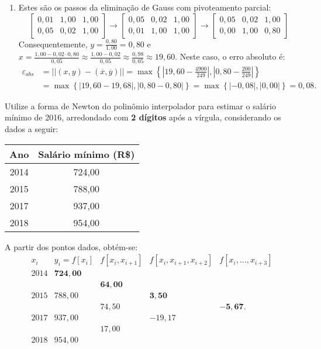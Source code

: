 \documentclass[12pt,a4paper]{article}
\begin{document}
\begin{ExerciseList}
\begin{enumerate}
\item Estes são os passos da eliminação de Gauss com pivoteamento parcial:
\[
\begin{bmatrix}
0,01 & 1,00 & 1,00\\
0,05 & 0,02 & 1,00
\end{bmatrix}
\rightarrow
\begin{bmatrix}
0,05 & 0,02 & 1,00\\
0,01 & 1,00 & 1,00
\end{bmatrix}
\rightarrow
\begin{bmatrix}
0,05 & 0,02 & 1,00\\
0,00 & 1,00 & 0,80
\end{bmatrix}
\]
Consequentemente, $y = \frac{0,80}{1,00} = 0,80$ e
$x = \frac{1,00 - 0,02 \cdot 0,80}{0,05}
\approx \frac{1,00 - 0,02}{0,05}
\approx \frac{0,98}{0,05}
\approx 19,60$. Neste caso, o erro absoluto é:
\begin{align*}
\varepsilon_{abs}
& = ||(x,y) - (\overline{x},\overline{y})||
  = \max \left\{ \left|19,60 - \frac{4900}{249}\right|, \left|0,80 - \frac{200}{249}\right| \right\}\\
& = \max \left\{ \left|19,60 - 19,68\right|, \left|0,80 - 0,80\right| \right\}
  = \max \left\{ \left|-0,08\right|, \left|0,00\right| \right\}
  = 0,08.
\end{align*}
\end{enumerate}


\Exercise[title={2,5}]
Utilize a forma de Newton do polinômio interpolador para estimar o salário mínimo de 2016, arredondado com \textbf{2 dígitos} após a vírgula, considerando os dados a seguir:
\medskip
\begin{center}
\begin{tabular}{cc}
\hline
Ano & Salário mínimo (R\$) \\
\hline
2014 & 724,00 \\
2015 & 788,00 \\
2017 & 937,00 \\
2018 & 954,00 \\
\hline
\end{tabular}
\end{center}
\Answer
A partir dos pontos dados, obtém-se:
\[
\begin{array}{ccccc}
x_i
& y_i=f[x_i]
& f[x_i,x_{i+1}]
& f[x_i,x_{i+1},x_{i+2}]
& f[x_i,\ldots,x_{i+3}]\\
2014 & \mathbf{724,00} \\
     & & \mathbf{64,00} \\
2015 & 788,00 & & \mathbf{3,50} \\
     & & 74,50 & & \mathbf{-5,67}. \\
2017 & 937,00 & & -19,17 \\
     & & 17,00 \\
2018 & 954,00
\end{array}
\]


\end{ExerciseList}
\end{document}
